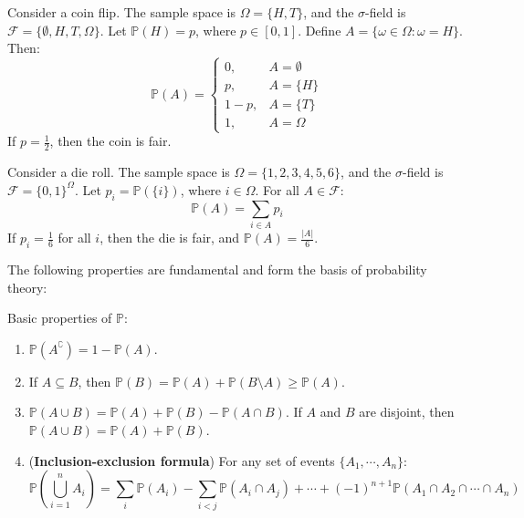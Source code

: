\documentclass{huhtakm-template-book}
\newcommand{\prob}{\mathbb{P}}
\begin{document}
    \newpage
    \begin{eg}
        Consider a coin flip. The sample space is $\Omega=\{H,T\}$, and the $\sigma$-field is $\mathcal{F}=\{\emptyset,H,T,\Omega\}$. Let $\prob(H)=p$, where $p\in[0,1]$. Define $A=\{\omega\in\Omega:\omega = H\}$. Then:
        \begin{equation*}
            \prob(A)=\begin{cases}
                0, &A=\emptyset\\
                p, &A=\{H\}\\
                1-p, &A=\{T\}\\
                1, &A=\Omega
            \end{cases}
        \end{equation*}
        If $p=\frac{1}{2}$, then the coin is fair.   
    \end{eg}
    \begin{eg}
        Consider a die roll. The sample space is $\Omega=\{1,2,3,4,5,6\}$, and the $\sigma$-field is $\mathcal{F}=\{0,1\}^{\Omega}$. Let $p_{i}=\prob(\{i\})$, where $i\in\Omega$. For all $A\in\mathcal{F}$:
        \begin{equation*}
            \prob(A)=\sum_{i\in A}p_{i}
        \end{equation*}
        If $p_{i}=\frac{1}{6}$ for all $i$, then the die is fair, and $\prob(A)=\frac{|A|}{6}$.
    \end{eg}
    The following properties are fundamental and form the basis of probability theory:
    \begin{lem}
        Basic properties of $\prob$:
        \begin{enumerate}
            \item $\prob(A^{\complement})=1-\prob(A)$.
            \item If $A\subseteq B$, then $\prob(B)=\prob(A)+\prob(B\setminus A)\geq\prob(A)$.
            \item $\prob(A\cup B)=\prob(A)+\prob(B)-\prob(A\cap B)$. If $A$ and $B$ are disjoint, then $\prob(A\cup B)=\prob(A)+\prob(B)$.
            \item (\textbf{Inclusion-exclusion formula}) For any set of events $\{A_{1},\cdots,A_{n}\}$:
            \begin{equation*}
                \prob\left(\bigcup_{i=1}^{n}A_{i}\right)=\sum_{i}\prob(A_{i})-\sum_{i<j}\prob(A_{i}\cap A_{j})+\cdots+(-1)^{n+1}\prob(A_{1}\cap A_{2}\cap\cdots\cap A_{n})
            \end{equation*}
        \end{enumerate}
    \end{lem}
\end{document}

